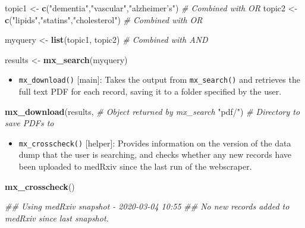 \documentclass[a4paper, twoside]{templates/ociamthesis}
\providecommand{\tightlist}{%
  \setlength{\itemsep}{0pt}\setlength{\parskip}{0pt}}
\newenvironment{Shaded}{\begin{snugshade}}{\end{snugshade}}
\newcommand{\CommentTok}[1]{\textcolor[rgb]{0.56,0.35,0.01}{\textit{#1}}}
\newcommand{\KeywordTok}[1]{\textcolor[rgb]{0.13,0.29,0.53}{\textbf{#1}}}
\newcommand{\NormalTok}[1]{#1}
\newcommand{\StringTok}[1]{\textcolor[rgb]{0.31,0.60,0.02}{#1}}
\renewenvironment{Shaded}
{
  \vspace{4pt}%
  \begin{snugshade}%
}{%
  \end{snugshade}%
  \vspace{4pt}%
}
\begin{document}
\begin{Shaded}
\begin{Highlighting}[]
\NormalTok{topic1  <-}\StringTok{ }\KeywordTok{c}\NormalTok{(}\StringTok{"dementia"}\NormalTok{,}\StringTok{"vascular"}\NormalTok{,}\StringTok{"alzheimer's"}\NormalTok{)  }\CommentTok{# Combined with OR}
\NormalTok{topic2  <-}\StringTok{ }\KeywordTok{c}\NormalTok{(}\StringTok{"lipids"}\NormalTok{,}\StringTok{"statins"}\NormalTok{,}\StringTok{"cholesterol"}\NormalTok{)     }\CommentTok{# Combined with OR}

\NormalTok{myquery <-}\StringTok{ }\KeywordTok{list}\NormalTok{(topic1, topic2)                    }\CommentTok{# Combined with AND}

\NormalTok{results <-}\StringTok{ }\KeywordTok{mx_search}\NormalTok{(myquery)}
\end{Highlighting}
\end{Shaded}

\begin{itemize}
\tightlist
\item
  \texttt{mx\_download()} {[}main{]}: Takes the output from \texttt{mx\_search()} and retrieves the full text PDF for each record, saving it to a folder specified by the user.
\end{itemize}

\begin{Shaded}
\begin{Highlighting}[]
\KeywordTok{mx_download}\NormalTok{(results,        }\CommentTok{# Object returned by mx_search}
            \StringTok{"pdf/"}\NormalTok{)         }\CommentTok{# Directory to save PDFs to }
\end{Highlighting}
\end{Shaded}

\begin{itemize}
\tightlist
\item
  \texttt{mx\_crosscheck()} {[}helper{]}: Provides information on the version of the data dump that the user is searching, and checks whether any new records have been uploaded to medRxiv since the last run of the webscraper.
\end{itemize}

\begin{Shaded}
\begin{Highlighting}[]
\KeywordTok{mx_crosscheck}\NormalTok{()}

\CommentTok{## Using medRxiv snapshot - 2020-03-04 10:55}
\CommentTok{## No new records added to medRxiv since last snapshot.}
\end{Highlighting}
\end{Shaded}
\end{document}
